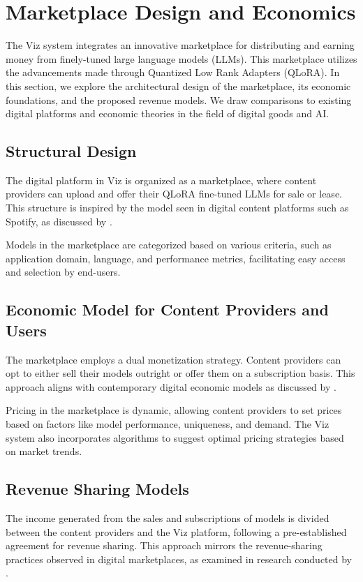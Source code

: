 \documentclass{article}
\begin{document}
\section{Marketplace Design and Economics}

The Viz system integrates an innovative marketplace for distributing and earning money from finely-tuned large language models (LLMs). This marketplace utilizes the advancements made through Quantized Low Rank Adapters (QLoRA). In this section, we explore the architectural design of the marketplace, its economic foundations, and the proposed revenue models. We draw comparisons to existing digital platforms and economic theories in the field of digital goods and AI.

\subsection{Structural Design}
The digital platform in Viz is organized as a marketplace, where content providers can upload and offer their QLoRA fine-tuned LLMs for sale or lease. This structure is inspired by the model seen in digital content platforms such as Spotify, as discussed by \cite{NBERw24713}.

Models in the marketplace are categorized based on various criteria, such as application domain, language, and performance metrics, facilitating easy access and selection by end-users.

\subsection{Economic Model for Content Providers and Users}

The marketplace employs a dual monetization strategy. Content providers can opt to either sell their models outright or offer them on a subscription basis. This approach aligns with contemporary digital economic models as discussed by \cite{10.7208/chicago/9780226613475.001.0001}.

Pricing in the marketplace is dynamic, allowing content providers to set prices based on factors like model performance, uniqueness, and demand. The Viz system also incorporates algorithms to suggest optimal pricing strategies based on market trends.

\subsection{Revenue Sharing Models}
The income generated from the sales and subscriptions of models is divided between the content providers and the Viz platform, following a pre-established agreement for revenue sharing. This approach mirrors the revenue-sharing practices observed in digital marketplaces, as examined in research conducted by \cite{10.1162/154247603322493212}.
\end{document}
